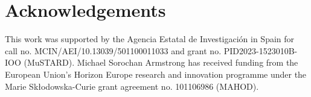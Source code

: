 \documentclass[preprint,12pt]{elsarticle}
\begin{document}
\section{Acknowledgements}

This work was supported by the Agencia Estatal de Investigación in Spain for call no. MCIN/AEI/10.13039/501100011033 and grant no. PID2023-1523010B-IOO (MuSTARD). Michael Sorochan Armstrong has received funding from the European Union's Horizon Europe research and innovation programme under the Marie Skłodowska-Curie grant agreement no. 101106986 (MAHOD).








\end{document}
